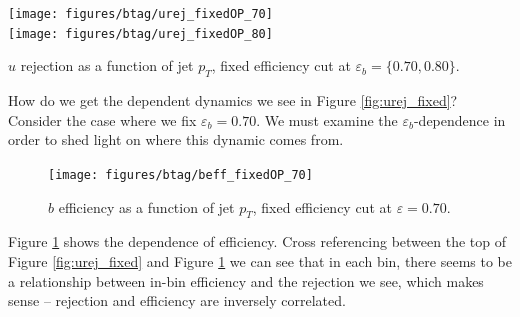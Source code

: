 \begin{FPfigure}
\texttt{[image: figures/btag/urej\_fixedOP\_70]}\\
\texttt{[image: figures/btag/urej\_fixedOP\_80]}
\caption[perf_plot]{$u$ rejection as a function of jet $p_T$, fixed efficiency cut at $\varepsilon_b = \{0.70, 0.80\}$.
\label{fig:urej_fixed}}
\end{FPfigure}

How do we get the \pt dependent dynamics we see in Figure \ref{fig:urej_fixed}? Consider the case where we fix $\varepsilon_b = 0.70$. We must examine the $\varepsilon_b$-\pt dependence in order to shed light on where this dynamic comes from.

\begin{figure}
\texttt{[image: figures/btag/beff\_fixedOP\_70]}
\caption[perf_plot]{$b$ efficiency as a function of jet $p_T$, fixed efficiency cut at $\varepsilon = 0.70$.
\label{fig:beff_fixedOP_70}}
\end{figure}

Figure \ref{fig:beff_fixedOP_70} shows the \pt dependence of efficiency. Cross referencing between the top of Figure \ref{fig:urej_fixed} and Figure \ref{fig:beff_fixedOP_70} we can see that in each \pt bin, there seems to be a relationship between in-bin efficiency and the rejection we see, which makes sense -- rejection and efficiency are inversely correlated. 

